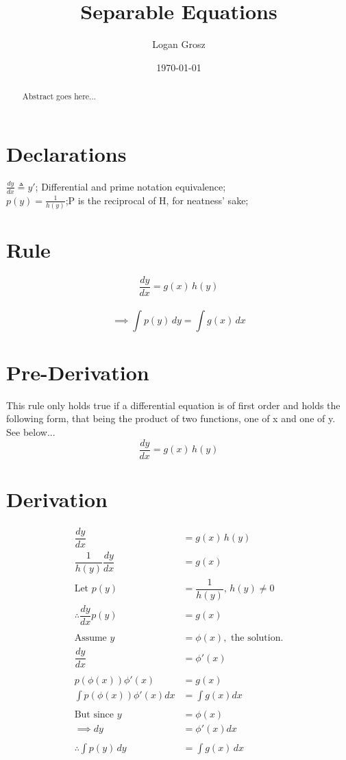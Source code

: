 \documentclass{article}
\begin{document}
	
\author{Logan Grosz}
\title{Separable Equations}
\date{\today}

\maketitle

\begin{abstract}
	Abstract goes here...
\end{abstract}

\section{Declarations}

$\frac{dy}{dx}\triangleq y'$; Differential and prime notation equivalence;\\
$p(y)=\frac{1}{h(y)}$;P is the reciprocal of H, for neatness' sake;

\section{Rule}
$$\dfrac{dy}{dx}=g(x)\,h(y)$$\\
$$\implies\int p(y)\,dy=\int g(x)\,dx$$

\section{Pre-Derivation}
This rule only holds true if a differential equation is of first order and holds the following form, that being the product of two functions, one of x and one of y. See below...\\

$$\dfrac{dy}{dx}=g(x)\,h(y)$$

\section{Derivation}

\begin{align*}
	\dfrac{dy}{dx}&=g(x)\,h(y)\\
	\dfrac{1}{h(y)}\dfrac{dy}{dx}&=g(x)\\
	\text{Let }p(y)&=\dfrac{1}{h(y)},\,h(y)\neq 0\\
	\therefore\dfrac{dy}{dx}p(y)&=g(x)\\\\
	\text{Assume }y&=\phi(x),\text{ the solution.}\\
	\dfrac{dy}{dx}&=\phi '(x)\\\\
	p(\phi(x))\phi '(x)&=g(x)\\
	\int p(\phi(x))\phi '(x)dx&=\int g(x) dx\\\\
	\text{But since }y&=\phi(x)\\
	\implies dy&=\phi '(x)dx\\\\
	\therefore \int p(y)\,dy&=\int g(x)\,dx
\end{align*}
\end{document}
